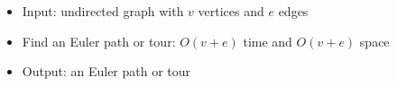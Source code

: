 \begin{itemize}
	\item Input: undirected graph with $v$ vertices and $e$ edges
	\item Find an Euler path or tour: $O(v+e)$ time and $O(v+e)$ space
	\item Output: an Euler path or tour
\end{itemize}